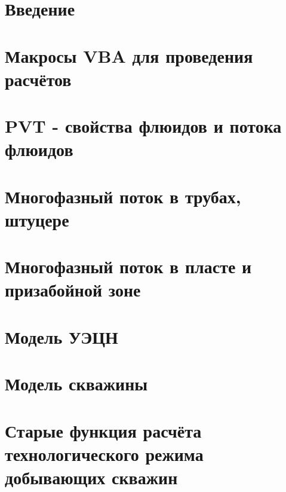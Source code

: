 \documentclass[a4paper,14pt,oneside,openany]{memoir}
\begin{document}
	
	
	\chapter*{Введение}                         %
	\chapter{Макросы VBA для проведения расчётов}
	\chapter{PVT - свойства флюидов и потока флюидов}
	\chapter{Многофазный поток в трубах, штуцере }
	\chapter{Многофазный поток в пласте и призабойной зоне}
	\chapter{Модель УЭЦН}
	\chapter{Модель скважины}
    \chapter{Старые функция расчёта технологического режима добывающих скважин}
	
\end{document}
